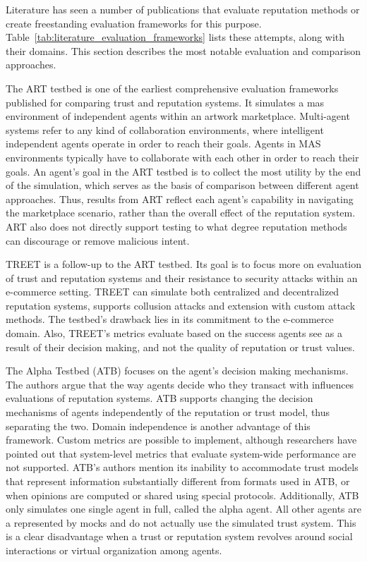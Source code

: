 \documentclass[%
    ]{\PathToTumTemplate/thesis/tum_thesis}
\begin{document}
Literature has seen a number of publications that evaluate reputation methods or create freestanding evaluation frameworks for this purpose.
Table~\ref{tab:literature_evaluation_frameworks} lists these attempts, along with their domains.
This section describes the most notable evaluation and comparison approaches.

The ART testbed is one of the earliest comprehensive evaluation frameworks published for comparing trust and reputation systems\cite{fullam_specication_2005}.
It simulates a \acrfull{mas} environment of independent agents within an artwork marketplace.
Multi-agent systems refer to any kind of collaboration environments, where intelligent independent agents operate in order to reach their goals.
Agents in MAS environments typically have to collaborate with each other in order to reach their goals.
An agent's goal in the ART testbed is to collect the most utility by the end of the simulation, which serves as the basis of comparison between different agent approaches.
Thus, results from ART reflect each agent's capability in navigating the marketplace scenario, rather than the overall effect of the reputation system.
ART also does not directly support testing to what degree reputation methods can discourage or remove malicious intent.

TREET is a follow-up to the ART testbed\cite{kerr_treet_2010}.
Its goal is to focus more on evaluation of trust and reputation systems and their resistance to security attacks within an e-commerce setting.
TREET can simulate both centralized and decentralized reputation systems, supports collusion attacks and extension with custom attack methods.
The testbed's drawback lies in its commitment to the e-commerce domain.
Also, TREET's metrics evaluate based on the success agents see as a result of their decision making, and not the quality of reputation or trust values.

The Alpha Testbed (ATB) focuses on the agent's decision making mechanisms\cite{jelenc_decision_2013}.
The authors argue that the way agents decide who they transact with influences evaluations of reputation systems.
ATB supports changing the decision mechanisms of agents independently of the reputation or trust model, thus separating the two.
Domain independence is another advantage of this framework.
Custom metrics are possible to implement, although researchers have pointed out that system-level metrics that evaluate system-wide performance are not supported\cite{adamopoulou_simulation_2014}.
ATB's authors mention its inability to accommodate trust models that represent information substantially different from formats used in ATB, or when opinions are computed or shared using special protocols.
Additionally, ATB only simulates one single agent in full, called the alpha agent.
All other agents are a represented by mocks and do not actually use the simulated trust system.
This is a clear disadvantage when a trust or reputation system revolves around social interactions or virtual organization among agents.
\end{document}
